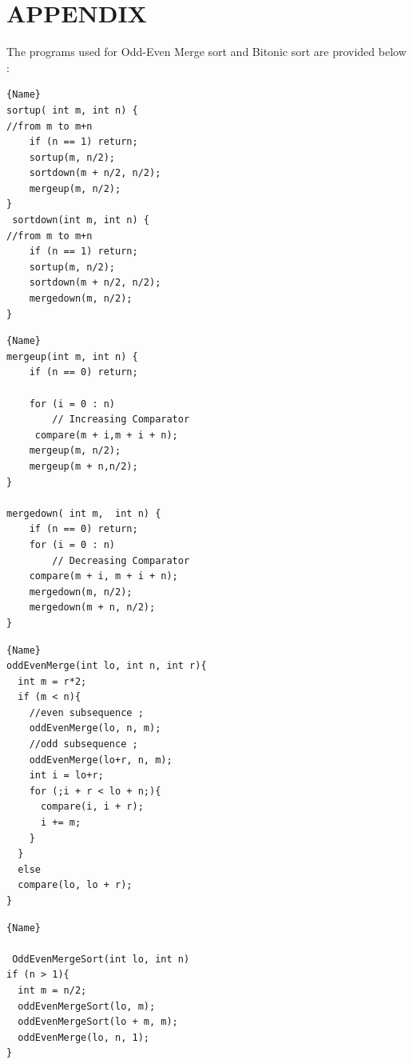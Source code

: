 \documentclass[12pt]{article}
\begin{document}
\lstset{                                    %
  language=C,
  frame=lines,
  captionpos=b
 }

\renewcommand{\lstlistingname}{Code}
\section*{APPENDIX}

 The programs used for Odd-Even Merge sort and Bitonic sort are provided below : \\ 

\noindent\begin{minipage}{.45\textwidth}
\begin{lstlisting}[label=bitsort, caption=Bitonic Sort : sort from m to n,frame=tlrb]{Name}
sortup( int m, int n) {
//from m to m+n
    if (n == 1) return;
    sortup(m, n/2);
    sortdown(m + n/2, n/2);
    mergeup(m, n/2);
}
 sortdown(int m, int n) {
//from m to m+n
    if (n == 1) return;
    sortup(m, n/2);
    sortdown(m + n/2, n/2);
    mergedown(m, n/2);
}

\end{lstlisting}
\end{minipage}\hfill
\begin{minipage}{.50\textwidth}
\begin{lstlisting}[label=bitmerge, caption = Bitonic Merge,frame=tlrb]{Name}
mergeup(int m, int n) {  
    if (n == 0) return;
    
    for (i = 0 : n)
        // Increasing Comparator
	 compare(m + i,m + i + n);
    mergeup(m, n/2);
    mergeup(m + n,n/2);
}

mergedown( int m,  int n) { 
    if (n == 0) return;
    for (i = 0 : n) 
        // Decreasing Comparator
	compare(m + i, m + i + n); 
    mergedown(m, n/2);
    mergedown(m + n, n/2);
}
\end{lstlisting}
\end{minipage}
\noindent\begin{minipage}{.45\textwidth}
\begin{lstlisting}[label=oemerge, caption=Odd-Even Merge,frame=tlrb]{Name}
oddEvenMerge(int lo, int n, int r){
  int m = r*2;
  if (m < n){
    //even subsequence ;		
    oddEvenMerge(lo, n, m); 
    //odd subsequence ;
    oddEvenMerge(lo+r, n, m); 
    int i = lo+r;   
    for (;i + r < lo + n;){
      compare(i, i + r);
      i += m;
    }
  }
  else
  compare(lo, lo + r);
}
\end{lstlisting}
\end{minipage}\hfill
\begin{minipage}{.50\textwidth}
\begin{lstlisting}[label=oesort, caption = Odd-Even sort from lo to n,frame=tlrb]{Name}

 OddEvenMergeSort(int lo, int n)
if (n > 1){
  int m = n/2;
  oddEvenMergeSort(lo, m);
  oddEvenMergeSort(lo + m, m);
  oddEvenMerge(lo, n, 1);
}
\end{lstlisting}
\end{minipage}
\end{document}
